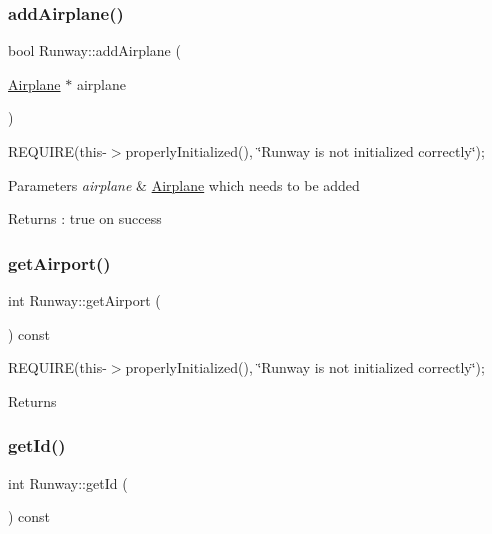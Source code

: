 \subsubsection{\texorpdfstring{add\+Airplane()}{addAirplane()}}
{\footnotesize\ttfamily bool Runway\+::add\+Airplane (\begin{DoxyParamCaption}\item[{\mbox{\hyperlink{class_airplane}{Airplane}} $\ast$}]{airplane }\end{DoxyParamCaption})}

R\+E\+Q\+U\+I\+RE(this-\/$>$properly\+Initialized(), \char`\"{}\+Runway is not initialized correctly\char`\"{}); 
\begin{DoxyParams}{Parameters}
{\em airplane} & \mbox{\hyperlink{class_airplane}{Airplane}} which needs to be added \\
\hline
\end{DoxyParams}
\begin{DoxyReturn}{Returns}
\+: true on success 
\end{DoxyReturn}
\mbox{\label{class_runway_ac6d84fd93863115c2b96912b4432d76e}} 
\subsubsection{\texorpdfstring{get\+Airport()}{getAirport()}}
{\footnotesize\ttfamily int Runway\+::get\+Airport (\begin{DoxyParamCaption}{ }\end{DoxyParamCaption}) const}

R\+E\+Q\+U\+I\+RE(this-\/$>$properly\+Initialized(), \char`\"{}\+Runway is not initialized correctly\char`\"{}); \begin{DoxyReturn}{Returns}

\end{DoxyReturn}
\mbox{\label{class_runway_afd718b92fbf2bdcbdc5c3da48a76c7af}} 
\subsubsection{\texorpdfstring{get\+Id()}{getId()}}
{\footnotesize\ttfamily int Runway\+::get\+Id (\begin{DoxyParamCaption}{ }\end{DoxyParamCaption}) const}

